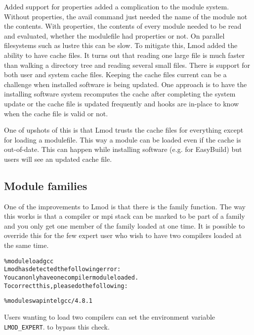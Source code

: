 Added support for properties added a complication to the module
system.  Without properties, the avail command just needed the name of
the module not the contents.  With properties, the contents of every
module needed to be read and evaluated, whether the modulefile had
properties or not. On parallel filesystems such as lustre this can be
slow.  To mitigate this, Lmod added the ability to have cache files.
It turns out that reading one large file is much faster than walking a
directory tree and reading several small files.  There is support for
both user and system cache files.  Keeping the cache files current can
be a challenge when installed software is being updated.  One approach
is to have the installing software system recomputes the cache after
completing the system update or the cache file is updated frequently
and hooks are in-place to know when the cache file is valid or not.

One of upshots of this is that Lmod trusts the cache files for
everything except for loading a modulefile.  This way a module can be
loaded even if the cache is out-of-date.  This can happen while
installing software (e.g. for EasyBuild) but users will see an updated
cache file.


\subsection{Module families}

One of the improvements to Lmod is that there is the family function.
The way this works is that a compiler or mpi stack can be marked to be
part of a family and you only get one member of the family loaded at
one time.  It is possible to override this for the few expert user who
wish to have two compilers loaded at the same time.

{\small
  \begin{alltt}
  \% module load gcc
  Lmod has detected the following error:
  You can only have one compiler module loaded.
  To correct this, please do the following:

  \%  module swap intel gcc/4.8.1
  \end{alltt}
}
\noindent
Users wanting to load two compilers can set the environment variable
\texttt{LMOD\_EXPERT}. to bypass this check.




